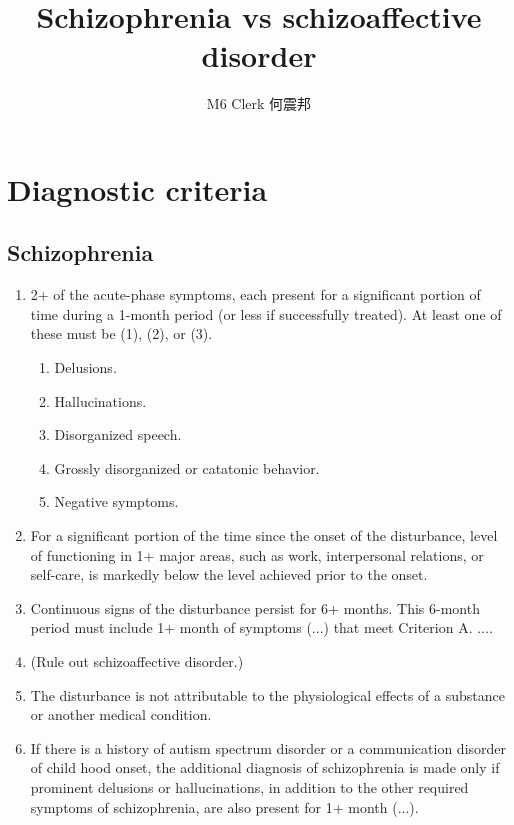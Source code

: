\documentclass{article}
\title{Schizophrenia vs schizoaffective disorder}
\author{M6 Clerk 何震邦}
\begin{document}
\maketitle
\section{Diagnostic criteria}
\renewcommand{\theenumi}{\Alph{enumi}}
\renewcommand{\theenumii}{\arabic{enumii}}
\subsection{Schizophrenia}
\begin{enumerate}
    \item 2+ of the acute-phase symptoms, each present for a significant
        portion of time during a 1-month period (or less if successfully
        treated).  At least one of these must be (1), (2), or (3).
        \begin{enumerate}
            \item Delusions.
            \item Hallucinations.
            \item Disorganized speech.
            \item Grossly disorganized or catatonic behavior.
            \item Negative symptoms.
        \end{enumerate}
    \item For a significant portion of the time since the onset of the
        disturbance, level of functioning in 1+ major areas, such
        as work, interpersonal relations, or self-care, is markedly below
        the level achieved prior to the onset.
    \item Continuous signs of the disturbance persist for 6+ months. This
        6-month period must include 1+ month of symptoms (...) that meet
        Criterion A. ....
    \item (Rule out schizoaffective disorder.)
    \item The disturbance is not attributable to the physiological effects
        of a substance or another medical condition.
    \item If there is a history of autism spectrum disorder or a
        communication disorder of child­ hood onset, the additional diagnosis
        of schizophrenia is made only if prominent delusions or
        hallucinations, in addition to the other required symptoms of
        schizophrenia, are also present for 1+ month (...).
\end{enumerate}
\end{document}
